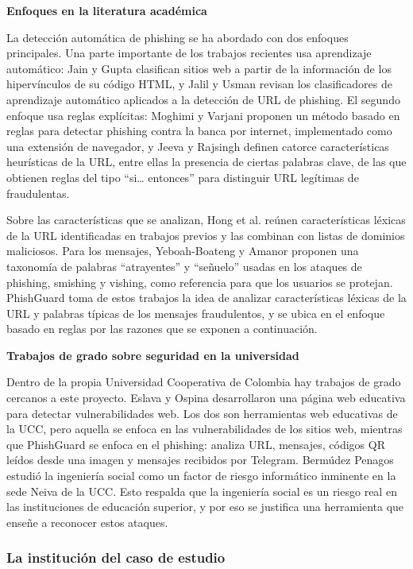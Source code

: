 \documentclass[journal,onecolumn,12pt,draftclsnofoot]{IEEEtran}
\newcommand{\apartado}[1]{\par\medskip\noindent\textbf{#1}\par\smallskip}
\begin{document}
\apartado{Enfoques en la literatura académica}

La detección automática de phishing se ha abordado con dos enfoques principales. Una parte importante de los trabajos recientes usa aprendizaje automático: Jain y Gupta \cite{jain} clasifican sitios web a partir de la información de los hipervínculos de su código HTML, y Jalil y Usman \cite{jalil} revisan los clasificadores de aprendizaje automático aplicados a la detección de URL de phishing. El segundo enfoque usa reglas explícitas: Moghimi y Varjani \cite{moghimi} proponen un método basado en reglas para detectar phishing contra la banca por internet, implementado como una extensión de navegador, y Jeeva y Rajsingh \cite{jeeva} definen catorce características heurísticas de la URL, entre ellas la presencia de ciertas palabras clave, de las que obtienen reglas del tipo ``si\ldots{} entonces'' para distinguir URL legítimas de fraudulentas.

Sobre las características que se analizan, Hong et al. \cite{hong} reúnen características léxicas de la URL identificadas en trabajos previos y las combinan con listas de dominios maliciosos. Para los mensajes, Yeboah-Boateng y Amanor \cite{yeboah} proponen una taxonomía de palabras ``atrayentes'' y ``señuelo'' usadas en los ataques de phishing, smishing y vishing, como referencia para que los usuarios se protejan. PhishGuard toma de estos trabajos la idea de analizar características léxicas de la URL y palabras típicas de los mensajes fraudulentos, y se ubica en el enfoque basado en reglas por las razones que se exponen a continuación.

\apartado{Trabajos de grado sobre seguridad en la universidad}

Dentro de la propia Universidad Cooperativa de Colombia hay trabajos de grado cercanos a este proyecto. Eslava y Ospina \cite{eslava} desarrollaron una página web educativa para detectar vulnerabilidades web. Los dos son herramientas web educativas de la UCC, pero aquella se enfoca en las vulnerabilidades de los sitios web, mientras que PhishGuard se enfoca en el phishing: analiza URL, mensajes, códigos QR leídos desde una imagen y mensajes recibidos por Telegram. Bermúdez Penagos \cite{bermudez} estudió la ingeniería social como un factor de riesgo informático inminente en la sede Neiva de la UCC. Esto respalda que la ingeniería social es un riesgo real en las instituciones de educación superior, y por eso se justifica una herramienta que enseñe a reconocer estos ataques.

\subsubsection{La institución del caso de estudio}
\end{document}
